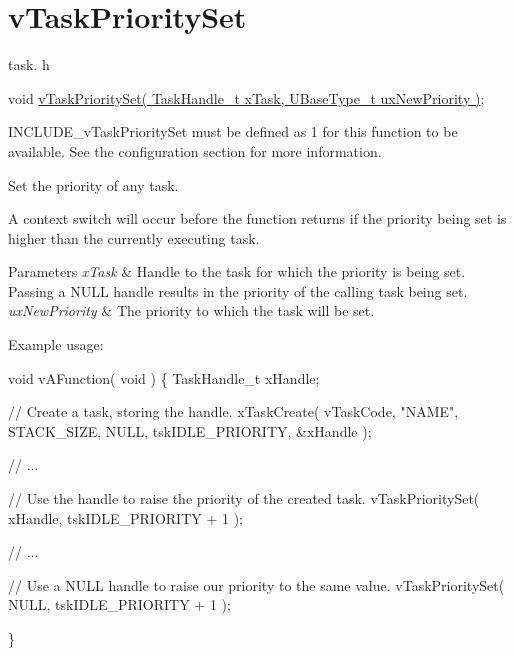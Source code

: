 \hypertarget{group__v_task_priority_set}{}\section{v\+Task\+Priority\+Set}
\label{group__v_task_priority_set}
task. h 
\begin{DoxyPre}void \hyperlink{task_8h_a1ee31be76e326e0644dbd6ac40a787b6}{vTaskPrioritySet( TaskHandle\_t xTask, UBaseType\_t uxNewPriority )};\end{DoxyPre}


I\+N\+C\+L\+U\+D\+E\+\_\+v\+Task\+Priority\+Set must be defined as 1 for this function to be available. See the configuration section for more information.

Set the priority of any task.

A context switch will occur before the function returns if the priority being set is higher than the currently executing task.


\begin{DoxyParams}{Parameters}
{\em x\+Task} & Handle to the task for which the priority is being set. Passing a N\+U\+LL handle results in the priority of the calling task being set.\\
\hline
{\em ux\+New\+Priority} & The priority to which the task will be set.\\
\hline
\end{DoxyParams}
Example usage\+: 
\begin{DoxyPre}
void vAFunction( void )
\{
TaskHandle\_t xHandle;
\begin{DoxyVerb}// Create a task, storing the handle.
xTaskCreate( vTaskCode, "NAME", STACK_SIZE, NULL, tskIDLE_PRIORITY, &xHandle );

// ...

// Use the handle to raise the priority of the created task.
vTaskPrioritySet( xHandle, tskIDLE_PRIORITY + 1 );

// ...

// Use a NULL handle to raise our priority to the same value.
vTaskPrioritySet( NULL, tskIDLE_PRIORITY + 1 );
\end{DoxyVerb}

\}
  \end{DoxyPre}
 